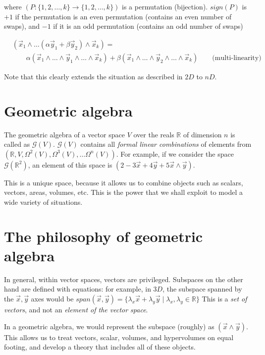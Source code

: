 \documentclass[11pt]{book}
\newcommand{\R}{\ensuremath{\mathbb R}}
\newcommand{\G}{\ensuremath{\mathcal{G}}}
\begin{document}
where $(P: \{1, 2, \dots, k\} \rightarrow \{1, 2, \dots, k \})$ is a
permutation (bijection). $sign(P)$ is $+1$ if the permutation is an
even permutation (contains an even number of swaps), and $-1$ if it
is an odd permutation (contains an odd number of swaps) 

\begin{align*}
    &(\vec x_1 \wedge \dots (\alpha \vec y_1 + \beta \vec y_2) \wedge \vec x_k) = \\
    &\qquad \alpha (\vec x_1 \wedge \dots \wedge \vec y_1 \wedge \dots \wedge \vec x_k) +
    \beta (\vec x_1 \wedge \dots \wedge  \vec y_2 \wedge \dots \wedge \vec x_k)
    \qquad \text{(multi-linearity)}
\end{align*}

Note that this clearly extends the situation as described in $2D$ to $nD$.


\section{Geometric algebra}

The geometric algebra of a vector space $V$ over the reals $\R$ of dimension $n$
is called as $\G(V)$. $\G(V)$ contains
all \emph{formal linear combinations} of elements from
$\left( \R, V, \Omega^2(V), \Omega^3(V), \dots \Omega^n(V) \right)$.
For example, if we consider the space $\G(\R^2)$, an element of this space 
is  $(2 -3 \vec x + 4 \vec y + 5 \vec x \wedge \vec y)$.

This is a unique space, because it allows us to combine objects such as 
scalars, vectors, areas, volumes, etc. This is the power that we shall exploit
to model a wide variety of situations.


\section{The philosophy of geometric algebra}
In general, within vector spaces, vectors are privileged. Subspaces on the
other hand are defined with equations: for example, in $3D$, the subspace
spanned by the $\vec x, \vec y$ axes would be $span(\vec x, \vec y) =  \{ \lambda_x \vec x  + \lambda_y \vec y \mid \lambda_x, \lambda_y \in \R \}$
This is a \emph{set of vectors}, and not an \emph{element of the vector space}.

In a geometric algebra, we would represent the subspace (roughly) as $(\vec x \wedge \vec y)$.
This allows us to treat vectors, scalar, volumes, and hypervolumes on
equal footing, and develop a theory that includes all of these objects.
\end{document}
